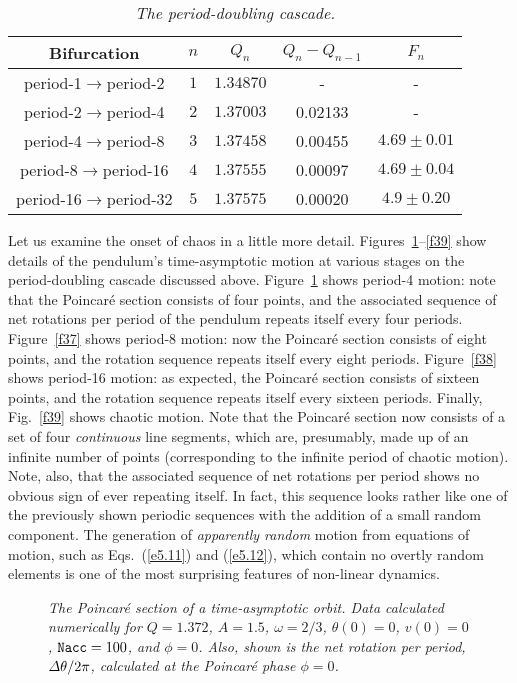 \begin{table}
\centering
\begin{tabular}{ccccc}\hline
Bifurcation & $n$ & $Q_n$ & $Q_{n} - Q_{n-1}$ & $F_n$\\\hline
period-1$\rightarrow$period-2 & $1$ & $1.34870$ & - & - \\
period-2$\rightarrow$period-4 & $2$ & $1.37003$ & 0.02133 & - \\
period-4$\rightarrow$period-8 & $3$ & $1.37458$ & 0.00455 & $4.69\pm 0.01$ \\
period-8$\rightarrow$period-16 & $4$ & $1.37555$ & 0.00097 & $4.69\pm 0.04$ \\
period-16$\rightarrow$period-32 & $5$ & $1.37575$ & 0.00020 & $4.9\pm 0.20$ \\
\hline
\end{tabular}
\caption{\em The period-doubling cascade.}\label{tpd}
\end{table}

Let us examine the onset of chaos in a little more detail. Figures~\ref{f36}--\ref{f39}
show details of the pendulum's time-asymptotic motion at various stages on the
period-doubling cascade discussed above. Figure~\ref{f36} shows period-4 motion:
note that the  Poincar\'{e} section consists of four points, and the associated sequence of
net rotations per period of the pendulum repeats itself every four periods.
 Figure~\ref{f37} shows period-8 motion:
now the Poincar\'{e} section consists of eight points, and the rotation sequence
 repeats itself every eight periods. Figure~\ref{f38} shows period-16 motion:
as expected, the Poincar\'{e} section consists of sixteen points, and the rotation sequence
 repeats itself every sixteen periods. Finally, Fig.~\ref{f39} shows chaotic motion. Note that
the Poincar\'{e} section now consists of a set of four {\em continuous} line segments, which are, presumably, made
up of an infinite number of points (corresponding to the infinite period of chaotic motion). 
Note, also, that the associated sequence of net rotations per period shows no obvious sign of ever
repeating itself. In fact, this sequence looks rather like one of the previously shown periodic
sequences with the addition of a small random component. The generation of {\em apparently
random} motion from   equations of motion, such as Eqs.~(\ref{e5.11}) and
(\ref{e5.12}), which contain no overtly random elements is one of the most surprising features of
non-linear dynamics.

\begin{figure}
\epsfysize=2.25in
\centerline{}
\caption{\em The Poincar\'{e} section of a time-asymptotic orbit. Data 
calculated numerically for $Q=1.372$, $A=1.5$, $\omega=2/3$,
$\theta(0)=0$, $v(0)=0$,
 ${\tt Nacc} =100$, and $\phi=0$. Also, shown is the
net rotation per period, ${\mit\Delta}\theta/2\pi$,  calculated at the Poincar\'{e} phase
$\phi=0$.}\label{f36}
\end{figure}

